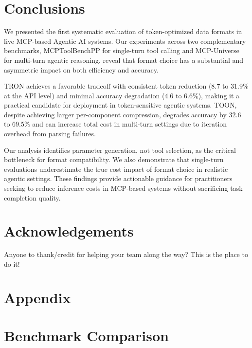 \documentclass[11pt]{article}
\begin{document}
\section*{Conclusions}

We presented the first systematic evaluation of token-optimized data formats in live MCP-based Agentic AI systems. Our experiments across two complementary benchmarks, MCPToolBenchPP for single-turn tool calling and MCP-Universe for multi-turn agentic reasoning, reveal that format choice has a substantial and asymmetric impact on both efficiency and accuracy.

TRON achieves a favorable tradeoff with consistent token reduction (8.7 to 31.9\% at the API level) and minimal accuracy degradation (4.6 to 6.6\%), making it a practical candidate for deployment in token-sensitive agentic systems. TOON, despite achieving larger per-component compression, degrades accuracy by 32.6 to 69.5\% and can increase total cost in multi-turn settings due to iteration overhead from parsing failures.

Our analysis identifies parameter generation, not tool selection, as the critical bottleneck for format compatibility. We also demonstrate that single-turn evaluations underestimate the true cost impact of format choice in realistic agentic settings. These findings provide actionable guidance for practitioners seeking to reduce inference costs in MCP-based systems without sacrificing task completion quality.


\section*{Acknowledgements}
Anyone to thank/credit for helping your team along the way? This is the place to do it!



\appendix
\section*{Appendix}

\section{Benchmark Comparison}
\label{app:benchmark_comparison}
\end{document}
